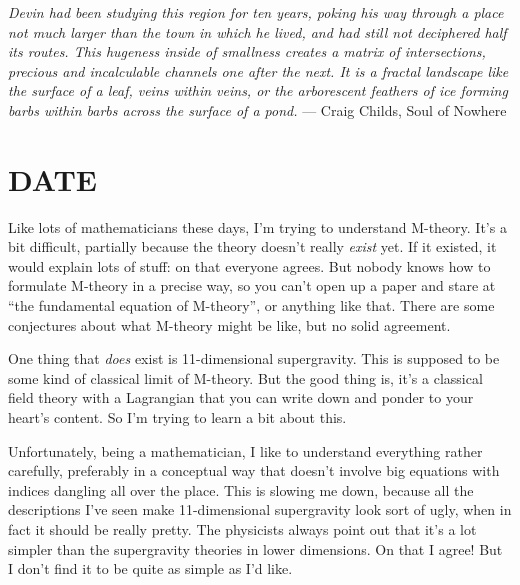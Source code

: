 \documentclass{article}
\begin{document}
\emph{Devin had been studying this region for ten years, poking his way
through a place not much larger than the town in which he lived, and had
still not deciphered half its routes. This hugeness inside of smallness
creates a matrix of intersections, precious and incalculable channels
one after the next. It is a fractal landscape like the surface of a
leaf, veins within veins, or the arborescent feathers of ice forming
barbs within barbs across the surface of a pond.} --- Craig Childs, Soul
of Nowhere
\hypertarget{week158}{%
\section{DATE}\label{week158}}

Like lots of mathematicians these days, I'm trying to understand
M-theory. It's a bit difficult, partially because the theory doesn't
really \emph{exist} yet. If it existed, it would explain lots of stuff:
on that everyone agrees. But nobody knows how to formulate M-theory in a
precise way, so you can't open up a paper and stare at ``the fundamental
equation of M-theory'', or anything like that. There are some
conjectures about what M-theory might be like, but no solid agreement.

One thing that \emph{does} exist is 11-dimensional supergravity. This is
supposed to be some kind of classical limit of M-theory. But the good
thing is, it's a classical field theory with a Lagrangian that you can
write down and ponder to your heart's content. So I'm trying to learn a
bit about this.

Unfortunately, being a mathematician, I like to understand everything
rather carefully, preferably in a conceptual way that doesn't involve
big equations with indices dangling all over the place. This is slowing
me down, because all the descriptions I've seen make 11-dimensional
supergravity look sort of ugly, when in fact it should be really pretty.
The physicists always point out that it's a lot simpler than the
supergravity theories in lower dimensions. On that I agree! But I don't
find it to be quite as simple as I'd like.
\end{document}
